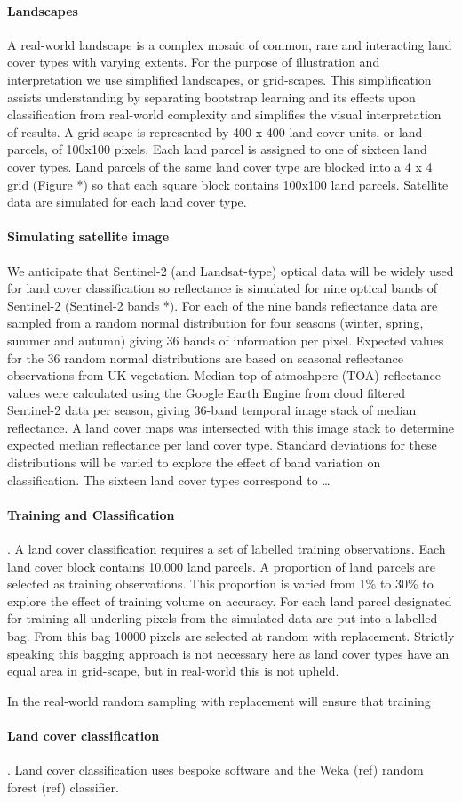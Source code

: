 \paragraph{Landscapes}
A real-world landscape is a complex mosaic of common, rare and interacting land cover types with varying extents.  For the purpose of illustration and interpretation we use simplified landscapes, or grid-scapes. This simplification assists understanding by separating bootstrap learning and its effects upon classification from real-world complexity and simplifies the visual interpretation of results. A grid-scape is represented by 400 x 400 land cover units, or land parcels, of 100x100 pixels.  Each land parcel is assigned to one of sixteen land cover types.  Land parcels of the same land cover type are blocked into a 4 x 4 grid (Figure *) so that each square block contains 100x100 land parcels.  Satellite data are simulated for each land cover type.


\paragraph{Simulating satellite image}
We anticipate that Sentinel-2 (and Landsat-type) optical data will be widely used for land cover classification so reflectance is simulated for nine optical bands of Sentinel-2 (Sentinel-2 bands  *).  For each of the nine bands reflectance data are sampled from a random normal distribution for four seasons (winter, spring, summer and autumn) giving 36 bands of information per pixel.  Expected values for the 36 random normal distributions are based on seasonal reflectance observations from UK vegetation.  Median top of atmoshpere (TOA) reflectance values were calculated using the Google Earth Engine from cloud filtered Sentinel-2 data per season, giving 36-band temporal image stack of median reflectance.  A land cover maps was intersected with this image stack to determine expected median reflectance per land cover type. Standard deviations for these distributions will be varied to explore the effect of band variation on classification. The sixteen land cover types correspond to \ldots



\paragraph{Training and Classification}.  A land cover classification requires a set of labelled training observations. Each land cover block contains 10,000 land parcels.  A proportion of land parcels are selected as training observations.  This proportion is varied from 1\% to 30\% to explore the effect of training volume on accuracy.  For each land parcel designated for training all underling pixels from the simulated data are put into a labelled bag.  From this bag 10000 pixels are selected at random with replacement.  Strictly speaking this bagging approach is not necessary here as land cover types have an equal area in grid-scape, but in real-world this is not upheld.  

In the real-world random sampling with replacement will ensure that training 

\paragraph{Land cover classification}.  Land cover classification uses bespoke software and the Weka (ref) random forest (ref) classifier.  
 